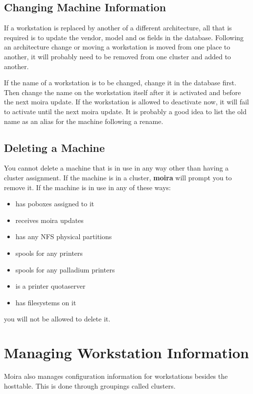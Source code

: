 \subsection{Changing Machine Information}
If a workstation is replaced by another of a different architecture,
all that is required is to update the vendor, model and os fields in
the database.  Following an architecture change or moving a
workstation is moved from one place to another, it will probably need
to be removed from one cluster and added to another.

\label{hostrename}
If the name of a workstation is to be changed, change it in the
database first.  Then change the name on the workstation itself after
it is activated and before the next moira update.  If the workstation
is allowed to deactivate now, it will fail to activate until the next
moira update.  It is probably a good idea to list the old name as an
alias for the machine following a rename.

\subsection{Deleting a Machine}
You cannot delete a machine that is in use in any way other than
having a cluster assignment.  If the machine is in a cluster,
{\bf moira} will prompt you to remove it.  If the machine is in use in
any of these ways:
\begin{itemize}
\item has poboxes assigned to it
\item receives moira updates
\item has any NFS physical partitions
\item spools for any printers
\item spools for any palladium printers
\item is a printer quotaserver
\item has filesystems on it
\end{itemize}
you will not be allowed to delete it.


\section{Managing Workstation Information}

Moira also manages configuration information for workstations besides
the hosttable.  This is done through groupings called clusters.


